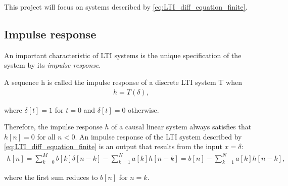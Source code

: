 This project will focus on systems described by \eqref{eq:LTI_diff_equation_finite}.

\subsection{Impulse response}
An important characteristic of LTI systems is the unique specification of the system by its \textit{impulse response}.
\begin{definition}\label{def:impulse_response}
A sequence h is called the impulse response of a discrete LTI system T when
\begin{align}
h=T(\delta),
\end{align}

where $\delta[t] = 1$ for $t = 0$ and $\delta[t] = 0$ otherwise.
\end{definition}

Therefore, the impulse response $h$ of a causal linear system always satisfies that $h[n] = 0$ for all $n < 0$. An impulse response of the LTI system described by \eqref{eq:LTI_diff_equation_finite} is an output that results from the input $x = \delta$:
\begin{align*}
h[n] = \sum_{k=0}^M b[k] \delta[n-k] - \sum_{k=1}^N a[k] h[n-k] = b[n] - \sum_{k=1}^N a[k] h[n-k],
\end{align*}

where the first sum reduces to $b[n]$ for $n = k$.
